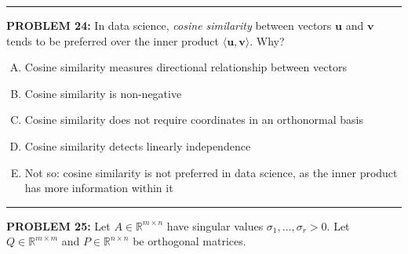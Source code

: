 \documentclass[12pt]{amsart}
\newcommand{\divider}{
  \vspace{-1em} %
  \noindent
  \raisebox{-0.15ex}{\textbullet}%
  \hspace{0.5em}%
  \rule[0.5ex]{0.95\textwidth}{1.0pt}%
  \hspace{0.5em}%
  \raisebox{-0.15ex}{\textbullet}%
  \vspace{0em} %
}
\begin{document}
{\divider


{\bf PROBLEM 24:}
% 
In data science, \emph{cosine similarity} between vectors $\mathbf{u}$ and $\mathbf{v}$ tends to be preferred over the inner product $\langle \mathbf{u}, \mathbf{v} \rangle$. Why?

\begin{enumerate}[(A)]
\item Cosine similarity measures directional relationship between vectors
\item Cosine similarity is non-negative
\item Cosine similarity does not require coordinates in an orthonormal basis
\item Cosine similarity detects linearly independence
\item Not so: cosine similarity is not preferred in data science, as the inner product has more information within it
\end{enumerate}


\divider


{\bf PROBLEM 25:}
%
Let $A \in \mathbb{R}^{m \times n}$ have singular values $\sigma_1, \ldots, \sigma_r > 0$. Let $Q \in \mathbb{R}^{m \times m}$ and $P \in \mathbb{R}^{n \times n}$ be orthogonal matrices.

}
\end{document}

